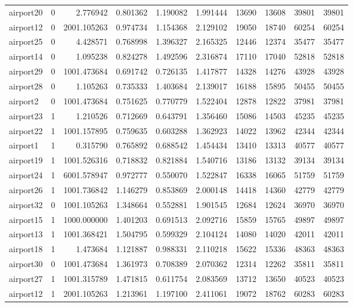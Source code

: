 \begin{longtable}{|l|r|r|r|r|r|r|r|r|r|}
airport20 & 0 & 2.776942 & 0.801362 & 1.190082 & 1.991444 & 13690 & 13608 & 39801 & 39801 \\
airport12 & 0 & 2001.105263 & 0.974734 & 1.154368 & 2.129102 & 19050 & 18740 & 60254 & 60254 \\
airport25 & 0 & 4.428571 & 0.768998 & 1.396327 & 2.165325 & 12446 & 12374 & 35477 & 35477 \\
airport14 & 0 & 1.095238 & 0.824278 & 1.492596 & 2.316874 & 17110 & 17040 & 52818 & 52818 \\
airport29 & 0 & 1001.473684 & 0.691742 & 0.726135 & 1.417877 & 14328 & 14276 & 43928 & 43928 \\
airport28 & 0 & 1.105263 & 0.735333 & 1.403684 & 2.139017 & 16188 & 15895 & 50455 & 50455 \\
airport2 & 0 & 1001.473684 & 0.751625 & 0.770779 & 1.522404 & 12878 & 12822 & 37981 & 37981 \\
airport23 & 1 & 1.210526 & 0.712669 & 0.643791 & 1.356460 & 15086 & 14503 & 45235 & 45235 \\
airport22 & 1 & 1001.157895 & 0.759635 & 0.603288 & 1.362923 & 14022 & 13962 & 42344 & 42344 \\
airport1 & 1 & 0.315790 & 0.765892 & 0.688542 & 1.454434 & 13410 & 13313 & 40577 & 40577 \\
airport19 & 1 & 1001.526316 & 0.718832 & 0.821884 & 1.540716 & 13186 & 13132 & 39134 & 39134 \\
airport24 & 1 & 6001.578947 & 0.972777 & 0.550070 & 1.522847 & 16338 & 16065 & 51759 & 51759 \\
airport26 & 1 & 1001.736842 & 1.146279 & 0.853869 & 2.000148 & 14418 & 14360 & 42779 & 42779 \\
airport32 & 0 & 1001.105263 & 1.348664 & 0.552881 & 1.901545 & 12684 & 12624 & 36970 & 36970 \\
airport15 & 1 & 1000.000000 & 1.401203 & 0.691513 & 2.092716 & 15859 & 15765 & 49897 & 49897 \\
airport13 & 1 & 1001.368421 & 1.504795 & 0.599329 & 2.104124 & 14080 & 14020 & 42011 & 42011 \\
airport18 & 1 & 1.473684 & 1.121887 & 0.988331 & 2.110218 & 15622 & 15336 & 48363 & 48363 \\
airport30 & 0 & 1001.473684 & 1.361973 & 0.708389 & 2.070362 & 12314 & 12262 & 35811 & 35811 \\
airport27 & 1 & 1001.315789 & 1.471815 & 0.611754 & 2.083569 & 13712 & 13650 & 40523 & 40523 \\
airport12 & 1 & 2001.105263 & 1.213961 & 1.197100 & 2.411061 & 19072 & 18762 & 60283 & 60283 \\

\end{longtable}

